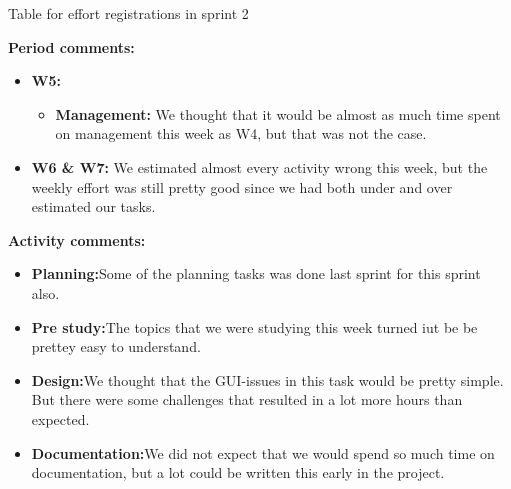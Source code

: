 \begin{table}
\caption{Table for effort registrations in sprint 2} \label{tab:effortweekss2}

\textbf{Period comments:}
\begin{itemize}
\item{}\textbf{W5:}
\begin{itemize}
\item{}\textbf{Management:} We thought that it would be almost as much time spent on management this week as W4, but that was not the case.
\end{itemize}
\item{}\textbf{W6 \& W7:} We estimated almost every activity wrong this week, but the weekly effort was still pretty good since we had both under and over estimated our tasks.
\end{itemize}

\textbf{Activity comments:}
\begin{itemize}
\item{}\textbf{Planning:}Some of the planning tasks was done last sprint for this sprint also.
\item{}\textbf{Pre study:}The topics that we were studying this week turned iut be be prettey easy to understand.
\item{}\textbf{Design:}We thought that the GUI-issues in this task would be pretty simple. But there were some challenges that resulted in a lot more hours than expected.
\item{}\textbf{Documentation:}We did not expect that we would spend so much time on documentation, but a lot could be written this early in the project.
\end{itemize}

\end{table}